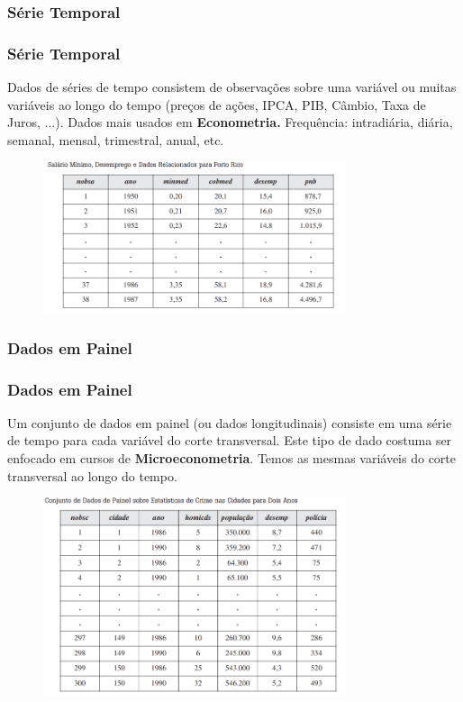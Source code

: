 \documentclass[10pt,xcolor=table]{beamer}
\begin{document}
\subsubsection{Série Temporal}

\begin{frame}\frametitle{Série Temporal} 

Dados de séries de tempo consistem de observações sobre uma variável ou muitas variáveis ao longo do tempo (preços de ações, IPCA, PIB, Câmbio, Taxa de Juros, ...). Dados mais usados em \textbf{Econometria.} Frequência: intradiária, diária, semanal, mensal, trimestral, anual, etc. 

  \begin{figure}[hb]
    \includegraphics[width=3.5in]{Figure/serietemporal.png}
  \end{figure}
\end{frame}

\subsubsection{Dados em Painel}
\begin{frame}\frametitle{Dados em Painel} 

Um conjunto de dados em painel (ou dados longitudinais) consiste em uma série de tempo para cada variável do corte transversal.  Este tipo de dado costuma ser enfocado em cursos de \textbf{Microeconometria}. Temos as mesmas variáveis do corte transversal ao longo do tempo.

  \begin{figure}[hb]
    \includegraphics[width=3.5in]{Figure/dadospainel.png}
  \end{figure}
\end{frame}
\end{document}
